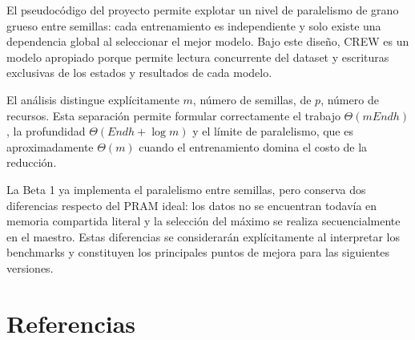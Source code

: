 \documentclass[11pt,a4paper]{article}
\begin{document}
El pseudocódigo del proyecto permite explotar un nivel de paralelismo de grano grueso
entre semillas: cada entrenamiento es independiente y solo existe una dependencia global
al seleccionar el mejor modelo. Bajo este diseño, CREW es un modelo apropiado porque
permite lectura concurrente del dataset y escrituras exclusivas de los estados y
resultados de cada modelo.

El análisis distingue explícitamente $m$, número de semillas, de $p$, número de recursos.
Esta separación permite formular correctamente el trabajo
$\Theta(m E n d h)$, la profundidad $\Theta(E n d h+\log m)$ y el límite de paralelismo,
que es aproximadamente $\Theta(m)$ cuando el entrenamiento domina el costo de la
reducción.

La Beta 1 ya implementa el paralelismo entre semillas, pero conserva dos diferencias
respecto del PRAM ideal: los datos no se encuentran todavía en memoria compartida literal
y la selección del máximo se realiza secuencialmente en el maestro. Estas diferencias se
considerarán explícitamente al interpretar los benchmarks y constituyen los principales
puntos de mejora para las siguientes versiones.

\section*{Referencias}

\end{document}

